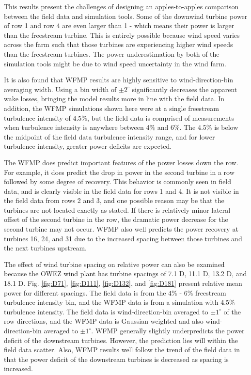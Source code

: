 \documentclass{umthesis}
\begin{document}
This results present the challenges of designing an apples-to-apples comparison between the field data and simulation tools. Some of the downwind turbine power of row 1 and row 4 are even larger than 1 - which means their power is larger than the freestream turbine. This is entirely possible because wind speed varies across the farm such that those turbines are experiencing higher wind speeds than the freestream turbines. The power underestimation by both of the simulation tools might be due to wind speed uncertainty in the wind farm.

It is also found that WFMP results are highly sensitive to wind-direction-bin averaging width. Using a bin width of $\pm2^\circ$ significantly decreases the apparent wake losses, bringing the model results more in line with the field data. In addition, the WFMP simulations shown here were at a single freestream turbulence intensity of 4.5\%, but the field data is comprised of measurements when turbulence intensity is anywhere between 4\% and 6\%. The 4.5\% is below the midpoint of the field data turbulence intensity range, and for lower turbulence intensity, greater power deficits are expected. 

The WFMP does predict important features of the power losses down the row. For example, it does predict the drop in power in the second turbine in a row followed by some degree of recovery. This behavior is commonly seen in field data, and is clearly visible in the field data for rows 1 and 4. It is not visible in the field data from rows 2 and 3, and one possible reason may be that the turbines are not located exactly as stated. If there is relatively minor lateral offset of the second turbine in the row, the dramatic power decrease for the second turbine may not occur. WFMP also well predicts the power recovery at turbines 16, 24, and 31 due to the increased spacing between those turbines and the next turbines upstream.

The effect of wind turbine spacing on relative power can also be examined because the OWEZ wind plant has turbine spacings of 7.1 D, 11.1 D, 13.2 D, and 18.1 D. Fig. \ref{fig:D71}, \ref{fig:D111}, \ref{fig:D132}, and \ref{fig:D181} present relative mean power for different spacings. The field data is from the 4\% - 6\% freestream turbulence intensity bin, and the WFMP data is from a simulation with 4.5\% turbulence intensity. The field data is wind-direction-bin averaged to $\pm1^\circ$ of the row directions, and the WFMP data is Gaussian weighted and also wind-direction-bin averaged to $\pm1^\circ$. WFMP generally slightly underpredicts the power deficit of the downstream turbines. However, the prediction lies will within the field data scatter. Also, WFMP results well follow the trend of the field data in that the power deficit of the downstream turbines is decreased as spacing is increased.
\end{document}
